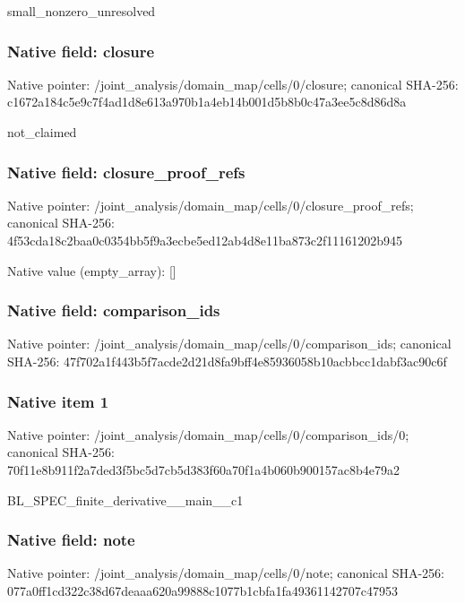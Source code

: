 \documentclass[10pt,a4paper]{article}
\begin{document}
\begingroup\raggedright\sloppy small\_\allowbreak{}nonzero\_\allowbreak{}unresolved\par\endgroup

\subsubsection{Native field: closure}
Native pointer: /joint\_\allowbreak{}analysis/domain\_\allowbreak{}map/cells/0/closure; canonical SHA-256: c1672a184c5e9c7f4ad1d8e613a970b1a4eb14b001d5b8b0c47a3ee5c8d86d8a

\begingroup\raggedright\sloppy not\_\allowbreak{}claimed\par\endgroup

\subsubsection{Native field: closure\_\allowbreak{}proof\_\allowbreak{}refs}
Native pointer: /joint\_\allowbreak{}analysis/domain\_\allowbreak{}map/cells/0/closure\_\allowbreak{}proof\_\allowbreak{}refs; canonical SHA-256: 4f53cda18c2baa0c0354bb5f9a3ecbe5ed12ab4d8e11ba873c2f11161202b945

Native value (empty\_\allowbreak{}array): []

\subsubsection{Native field: comparison\_\allowbreak{}ids}
Native pointer: /joint\_\allowbreak{}analysis/domain\_\allowbreak{}map/cells/0/comparison\_\allowbreak{}ids; canonical SHA-256: 47f702a1f443b5f7acde2d21d8fa9bff4e85936058b10acbbcc1dabf3ac90c6f

\subsubsection{Native item 1}
Native pointer: /joint\_\allowbreak{}analysis/domain\_\allowbreak{}map/cells/0/comparison\_\allowbreak{}ids/0; canonical SHA-256: 70f11e8b911f2a7ded3f5bc5d7cb5d383f60a70f1a4b060b900157ac8b4e79a2

\begingroup\raggedright\sloppy BL\_\allowbreak{}SPEC\_\allowbreak{}finite\_\allowbreak{}derivative\_\allowbreak{}\_\allowbreak{}main\_\allowbreak{}\_\allowbreak{}c1\par\endgroup

\subsubsection{Native field: note}
Native pointer: /joint\_\allowbreak{}analysis/domain\_\allowbreak{}map/cells/0/note; canonical SHA-256: 077a0ff1cd322c38d67deaaa620a99888c1077b1cbfa1fa49361142707c47953
\end{document}
